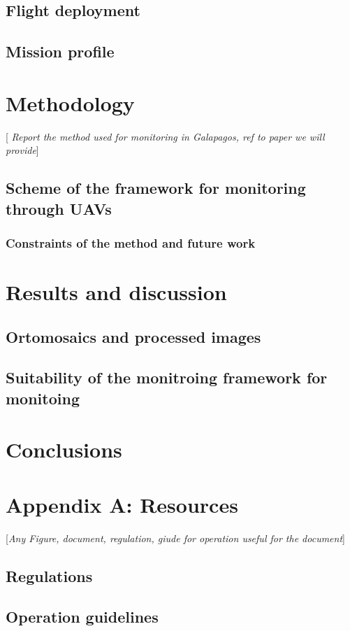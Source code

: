 \documentclass[10pt,english, openany]{book}
\begin{document}
\section{Flight deployment}
\section{Mission profile}

\chapter{Methodology}\label{chapt:results}
[\textit{ Report the method used for monitoring in Galapagos, ref to paper we will provide}]
\section{Scheme of the framework for monitoring through UAVs}
\subsection{Constraints of the method and future work}

\chapter{Results and discussion}

\section{Ortomosaics and processed images}


\section{Suitability of the monitroing framework for monitoing}

\chapter{Conclusions}

\pagebreak





\pagebreak

\chapter*{Appendix A: Resources}
[\textit{Any Figure, document, regulation, giude for operation useful for the document}]
\section*{Regulations}
\section*{Operation guidelines}
\end{document}
